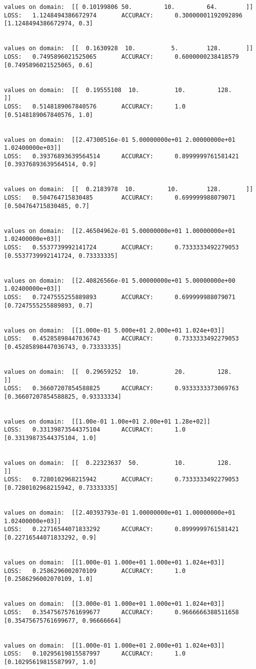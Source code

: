 \documentclass[11pt]{article}
\begin{document}
    \begin{Verbatim}[commandchars=\\\{\}]
values on domain:  [[ 0.10199806 50.         10.         64.        ]]
LOSS:   1.1248494386672974       ACCURACY:      0.30000001192092896
[1.1248494386672974, 0.3]


values on domain:  [[  0.1630928  10.          5.        128.       ]]
LOSS:   0.7495896021525065       ACCURACY:      0.6000000238418579
[0.7495896021525065, 0.6]


values on domain:  [[  0.19555108  10.          10.         128.        ]]
LOSS:   0.5148189067840576       ACCURACY:      1.0
[0.5148189067840576, 1.0]


values on domain:  [[2.47300516e-01 5.00000000e+01 2.00000000e+01
1.02400000e+03]]
LOSS:   0.39376893639564514      ACCURACY:      0.8999999761581421
[0.39376893639564514, 0.9]


values on domain:  [[  0.2183978  10.         10.        128.       ]]
LOSS:   0.504764715830485        ACCURACY:      0.699999988079071
[0.504764715830485, 0.7]


values on domain:  [[2.46504962e-01 5.00000000e+01 1.00000000e+01
1.02400000e+03]]
LOSS:   0.5537739992141724       ACCURACY:      0.7333333492279053
[0.5537739992141724, 0.73333335]


values on domain:  [[2.40826566e-01 5.00000000e+01 5.00000000e+00
1.02400000e+03]]
LOSS:   0.7247555255889893       ACCURACY:      0.699999988079071
[0.7247555255889893, 0.7]


values on domain:  [[1.000e-01 5.000e+01 2.000e+01 1.024e+03]]
LOSS:   0.45285898447036743      ACCURACY:      0.7333333492279053
[0.45285898447036743, 0.73333335]


values on domain:  [[  0.29659252  10.          20.         128.        ]]
LOSS:   0.36607207854588825      ACCURACY:      0.9333333373069763
[0.36607207854588825, 0.93333334]


values on domain:  [[1.00e-01 1.00e+01 2.00e+01 1.28e+02]]
LOSS:   0.33139873544375104      ACCURACY:      1.0
[0.33139873544375104, 1.0]


values on domain:  [[  0.22323637  50.          10.         128.        ]]
LOSS:   0.7280102968215942       ACCURACY:      0.7333333492279053
[0.7280102968215942, 0.73333335]


values on domain:  [[2.40393793e-01 1.00000000e+01 1.00000000e+01
1.02400000e+03]]
LOSS:   0.22716544071833292      ACCURACY:      0.8999999761581421
[0.22716544071833292, 0.9]


values on domain:  [[1.000e-01 1.000e+01 1.000e+01 1.024e+03]]
LOSS:   0.2586296002070109       ACCURACY:      1.0
[0.2586296002070109, 1.0]


values on domain:  [[3.000e-01 1.000e+01 1.000e+01 1.024e+03]]
LOSS:   0.35475675761699677      ACCURACY:      0.9666666388511658
[0.35475675761699677, 0.96666664]


values on domain:  [[1.000e-01 1.000e+01 2.000e+01 1.024e+03]]
LOSS:   0.10295619815587997      ACCURACY:      1.0
[0.10295619815587997, 1.0]


    \end{Verbatim}
\end{document}
